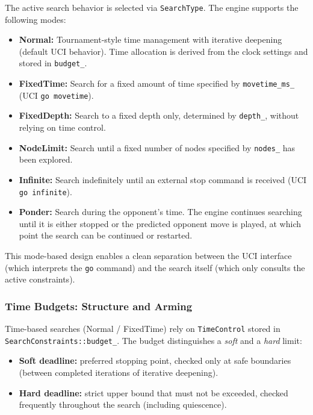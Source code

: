 The active search behavior is selected via \texttt{SearchType}. The engine
supports the following modes:
\begin{itemize}
    \item \textbf{Normal:} Tournament-style time management with iterative
    deepening (default UCI behavior). Time allocation is derived from the clock
    settings and stored in \texttt{budget\_}.
    \item \textbf{FixedTime:} Search for a fixed amount of time specified by
    \texttt{movetime\_ms\_} (UCI \texttt{go movetime}).
    \item \textbf{FixedDepth:} Search to a fixed depth only, determined by
    \texttt{depth\_}, without relying on time control.
    \item \textbf{NodeLimit:} Search until a fixed number of nodes specified by
    \texttt{nodes\_} has been explored.
    \item \textbf{Infinite:} Search indefinitely until an external stop command
    is received (UCI \texttt{go infinite}).
    \item \textbf{Ponder:} Search during the opponent’s time. The engine
    continues searching until it is either stopped or the predicted opponent
    move is played, at which point the search can be continued or restarted.
\end{itemize}

This mode-based design enables a clean separation between the UCI interface
(which interprets the \texttt{go} command) and the search itself (which only
consults the active constraints).

\subsubsection{Time Budgets: Structure and Arming}

Time-based searches (Normal / FixedTime) rely on \texttt{TimeControl} stored in
\texttt{SearchConstraints::\allowbreak budget\_}. The budget distinguishes a \emph{soft} and a
\emph{hard} limit:
\begin{itemize}
    \item \textbf{Soft deadline:} preferred stopping point, checked only at safe
    boundaries (between completed iterations of iterative deepening).
    \item \textbf{Hard deadline:} strict upper bound that must not be exceeded,
    checked frequently throughout the search (including quiescence).
\end{itemize}

